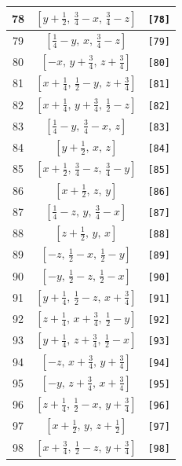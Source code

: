\documentclass[fleqn,8pt]{jsarticle}
\begin{document}
\begin{longtable}{ccc}
78 & $\left[ y + \frac{1}{2},\, \frac{3}{4} - x,\, \frac{3}{4} - z \right]$ & {\tt [78]} \\ \hline
79 & $\left[ \frac{1}{4} - y,\, x,\, \frac{3}{4} - z \right]$ & {\tt [79]} \\ \hline
80 & $\left[ - x,\, y + \frac{3}{4},\, z + \frac{3}{4} \right]$ & {\tt [80]} \\ \hline
81 & $\left[ x + \frac{1}{4},\, \frac{1}{2} - y,\, z + \frac{3}{4} \right]$ & {\tt [81]} \\ \hline
82 & $\left[ x + \frac{1}{4},\, y + \frac{3}{4},\, \frac{1}{2} - z \right]$ & {\tt [82]} \\ \hline
83 & $\left[ \frac{1}{4} - y,\, \frac{3}{4} - x,\, z \right]$ & {\tt [83]} \\ \hline
84 & $\left[ y + \frac{1}{2},\, x,\, z \right]$ & {\tt [84]} \\ \hline
85 & $\left[ x + \frac{1}{2},\, \frac{3}{4} - z,\, \frac{3}{4} - y \right]$ & {\tt [85]} \\ \hline
86 & $\left[ x + \frac{1}{2},\, z,\, y \right]$ & {\tt [86]} \\ \hline
87 & $\left[ \frac{1}{4} - z,\, y,\, \frac{3}{4} - x \right]$ & {\tt [87]} \\ \hline
88 & $\left[ z + \frac{1}{2},\, y,\, x \right]$ & {\tt [88]} \\ \hline
89 & $\left[ - z,\, \frac{1}{2} - x,\, \frac{1}{2} - y \right]$ & {\tt [89]} \\ \hline
90 & $\left[ - y,\, \frac{1}{2} - z,\, \frac{1}{2} - x \right]$ & {\tt [90]} \\ \hline
91 & $\left[ y + \frac{1}{4},\, \frac{1}{2} - z,\, x + \frac{3}{4} \right]$ & {\tt [91]} \\ \hline
92 & $\left[ z + \frac{1}{4},\, x + \frac{3}{4},\, \frac{1}{2} - y \right]$ & {\tt [92]} \\ \hline
93 & $\left[ y + \frac{1}{4},\, z + \frac{3}{4},\, \frac{1}{2} - x \right]$ & {\tt [93]} \\ \hline
94 & $\left[ - z,\, x + \frac{3}{4},\, y + \frac{3}{4} \right]$ & {\tt [94]} \\ \hline
95 & $\left[ - y,\, z + \frac{3}{4},\, x + \frac{3}{4} \right]$ & {\tt [95]} \\ \hline
96 & $\left[ z + \frac{1}{4},\, \frac{1}{2} - x,\, y + \frac{3}{4} \right]$ & {\tt [96]} \\ \hline
97 & $\left[ x + \frac{1}{2},\, y,\, z + \frac{1}{2} \right]$ & {\tt [97]} \\ \hline
98 & $\left[ x + \frac{3}{4},\, \frac{1}{2} - z,\, y + \frac{3}{4} \right]$ & {\tt [98]} \\ \hline

\end{longtable}
\end{document}
